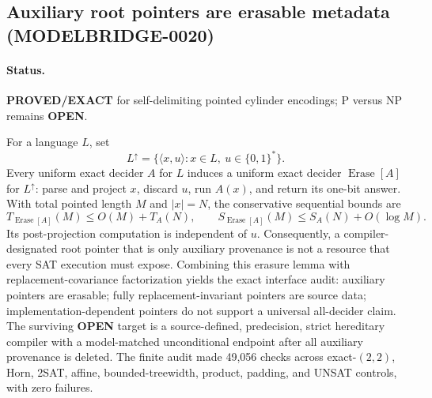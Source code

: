 \subsection{Auxiliary root pointers are erasable metadata (MODELBRIDGE-0020)}
\label{subsec:modelbridge0020}
\paragraph{Status.}
\textbf{PROVED/EXACT} for self-delimiting pointed cylinder encodings; P versus NP remains \textbf{OPEN}.

For a language $L$, set
\[
L^{\uparrow}=\{\langle x,u\rangle:x\in L,\ u\in\{0,1\}^*\}.
\]
Every uniform exact decider $A$ for $L$ induces a uniform exact decider
$\operatorname{Erase}[A]$ for $L^{\uparrow}$: parse and project $x$, discard
$u$, run $A(x)$, and return its one-bit answer.  With total pointed length
$M$ and $|x|=N$, the conservative sequential bounds are
\[
T_{\operatorname{Erase}[A]}(M)\le O(M)+T_A(N),\qquad
S_{\operatorname{Erase}[A]}(M)\le S_A(N)+O(\log M).
\]
Its post-projection computation is independent of $u$.  Consequently, a
compiler-designated root pointer that is only auxiliary provenance is not a
resource that every SAT execution must expose.  Combining this erasure lemma
with replacement-covariance factorization yields the exact interface audit:
auxiliary pointers are erasable; fully replacement-invariant pointers are
source data; implementation-dependent pointers do not support a universal
all-decider claim.  The surviving \textbf{OPEN} target is a source-defined,
predecision, strict hereditary compiler with a model-matched unconditional
endpoint after all auxiliary provenance is deleted.  The finite audit made
49,056 checks across exact-$(2,2)$, Horn, 2SAT, affine, bounded-treewidth,
product, padding, and UNSAT controls, with zero failures.
